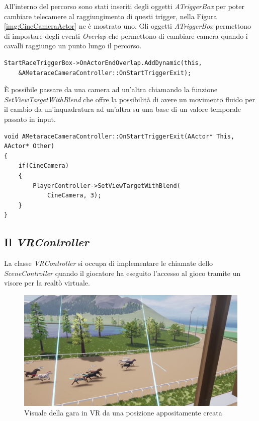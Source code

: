     All'interno del percorso sono stati inseriti degli oggetti \textit{ATriggerBox} per poter cambiare telecamere al raggiungimento di questi trigger, nella Figura \ref{img:CineCameraActor} ne è mostrato uno.
    Gli oggetti \textit{ATriggerBox} permettono di impostare degli eventi \textit{Overlap} che permettono di cambiare camera quando i cavalli raggiungo un punto lungo il percorso.

    \begin{lstlisting}[caption = Chiamata per l'aggiunta di una funzione all'evento overlap di un \textit{TriggerBox}]
StartRaceTriggerBox->OnActorEndOverlap.AddDynamic(this, 
    &AMetaraceCameraController::OnStartTriggerExit);
    \end{lstlisting}

    È possibile passare da una camera ad un'altra chiamando la funzione \textit{SetViewTargetWithBlend} che offre la possibilità di avere un movimento fluido per il cambio da un'inquadratura ad un'altra su una base di un valore temporale passato in input.

    \begin{lstlisting}[caption = Funzione per impostare la telecamera per la vista dell'utente]
void AMetaraceCameraController::OnStartTriggerExit(AActor* This, AActor* Other)
{
    if(CineCamera)
    {
        PlayerController->SetViewTargetWithBlend(
            CineCamera, 3); 
    }
}
    \end{lstlisting}

    \subsection{Il \textit{VRController}}

    La classe \textit{VRController} si occupa di implementare le chiamate dello \textit{SceneController} quando il giocatore ha eseguito l'accesso al gioco tramite un visore per la realtò virtuale.

    \begin{figure}[!ht]
        \centering
        \includegraphics[width=12cm]{figure/VRVisuale.png}
        \caption{Visuale della gara in VR da una posizione appositamente creata}
    \end{figure}

